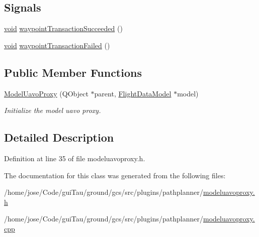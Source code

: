 \subsection*{Signals}
\begin{DoxyCompactItemize}
\item 
\hyperlink{group___u_a_v_objects_plugin_ga444cf2ff3f0ecbe028adce838d373f5c}{void} \hyperlink{group___o_p_map_plugin_gaf5825b310723b58fb271811c478954ec}{waypoint\-Transaction\-Succeeded} ()
\item 
\hyperlink{group___u_a_v_objects_plugin_ga444cf2ff3f0ecbe028adce838d373f5c}{void} \hyperlink{group___o_p_map_plugin_gafd0e6a7bd5963a1363aace5cbdaac47f}{waypoint\-Transaction\-Failed} ()
\end{DoxyCompactItemize}
\subsection*{Public Member Functions}
\begin{DoxyCompactItemize}
\item 
\hyperlink{group___o_p_map_plugin_ga42f653c17585ad777a3b74b7c561cfaa}{Model\-Uavo\-Proxy} (Q\-Object $\ast$parent, \hyperlink{class_flight_data_model}{Flight\-Data\-Model} $\ast$model)
\begin{DoxyCompactList}\small\item\em Initialize the model uavo proxy. \end{DoxyCompactList}\end{DoxyCompactItemize}


\subsection{Detailed Description}


Definition at line 35 of file modeluavoproxy.\-h.



The documentation for this class was generated from the following files\-:\begin{DoxyCompactItemize}
\item 
/home/jose/\-Code/gui\-Tau/ground/gcs/src/plugins/pathplanner/\hyperlink{modeluavoproxy_8h}{modeluavoproxy.\-h}\item 
/home/jose/\-Code/gui\-Tau/ground/gcs/src/plugins/pathplanner/\hyperlink{modeluavoproxy_8cpp}{modeluavoproxy.\-cpp}\end{DoxyCompactItemize}
